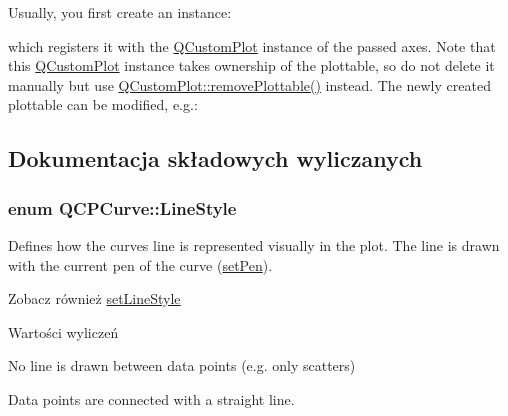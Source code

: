 Usually, you first create an instance\+: 
\begin{DoxyCodeInclude}
\end{DoxyCodeInclude}
which registers it with the \hyperlink{class_q_custom_plot}{Q\+Custom\+Plot} instance of the passed axes. Note that this \hyperlink{class_q_custom_plot}{Q\+Custom\+Plot} instance takes ownership of the plottable, so do not delete it manually but use \hyperlink{class_q_custom_plot_af3dafd56884208474f311d6226513ab2}{Q\+Custom\+Plot\+::remove\+Plottable()} instead. The newly created plottable can be modified, e.\+g.\+: 
\begin{DoxyCodeInclude}
\end{DoxyCodeInclude}


\subsection{Dokumentacja składowych wyliczanych}
\subsubsection[{\texorpdfstring{Line\+Style}{LineStyle}}]{\setlength{\rightskip}{0pt plus 5cm}enum {\bf Q\+C\+P\+Curve\+::\+Line\+Style}}\hypertarget{class_q_c_p_curve_a2710e9f79302152cff794c6e16cc01f1}{}\label{class_q_c_p_curve_a2710e9f79302152cff794c6e16cc01f1}
Defines how the curve\textquotesingle{}s line is represented visually in the plot. The line is drawn with the current pen of the curve (\hyperlink{class_q_c_p_abstract_plottable_ab74b09ae4c0e7e13142fe4b5bf46cac7}{set\+Pen}). \begin{DoxySeeAlso}{Zobacz również}
\hyperlink{class_q_c_p_curve_a4a377ec863ff81a1875c3094a6177c19}{set\+Line\+Style} 
\end{DoxySeeAlso}
\begin{Desc}
\item[Wartości wyliczeń]\par
\begin{description}
\item[{\em 
ls\+None\hypertarget{class_q_c_p_curve_a2710e9f79302152cff794c6e16cc01f1aec1601a191cdf0b4e761c4c66092cc48}{}\label{class_q_c_p_curve_a2710e9f79302152cff794c6e16cc01f1aec1601a191cdf0b4e761c4c66092cc48}
}]No line is drawn between data points (e.\+g. only scatters) \item[{\em 
ls\+Line\hypertarget{class_q_c_p_curve_a2710e9f79302152cff794c6e16cc01f1ade5822ce6fbf131d3df131795c2e1003}{}\label{class_q_c_p_curve_a2710e9f79302152cff794c6e16cc01f1ade5822ce6fbf131d3df131795c2e1003}
}]Data points are connected with a straight line. \end{description}
\end{Desc}



